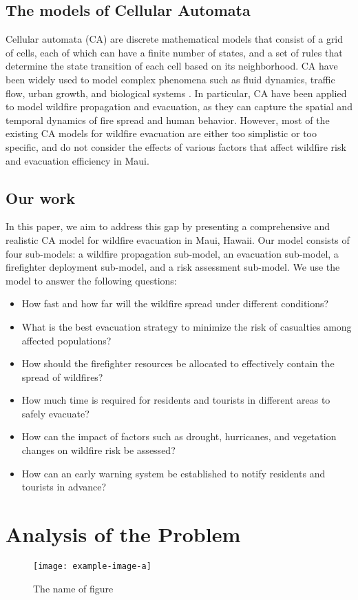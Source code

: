 \documentclass{mcmthesis}
\begin{document}
\subsection{The models of Cellular Automata}
Cellular automata (CA) are discrete mathematical models that consist of a grid of cells, each of which can have a finite number of states, and a set of rules that determine the state transition of each cell based on its neighborhood. CA have been widely used to model complex phenomena such as fluid dynamics, traffic flow, urban growth, and biological systems . In particular, CA have been applied to model wildfire propagation and evacuation, as they can capture the spatial and temporal dynamics of fire spread and human behavior. However, most of the existing CA models for wildfire evacuation are either too simplistic or too specific, and do not consider the effects of various factors that affect wildfire risk and evacuation efficiency in Maui.
\subsection{Our work}
In this paper, we aim to address this gap by presenting a comprehensive and realistic CA model for wildfire evacuation in Maui, Hawaii. Our model consists of four sub-models: a wildfire propagation sub-model, an evacuation sub-model, a firefighter deployment sub-model, and a risk assessment sub-model. We use the model to answer the following questions:
\lipsum[3]
\begin{itemize}
\item How fast and how far will the wildfire spread under different conditions?
\item What is the best evacuation strategy to minimize the risk of casualties among affected populations?
\item How should the firefighter resources be allocated to effectively contain the spread of wildfires?
\item How much time is required for residents and tourists in different areas to safely evacuate?
\item How can the impact of factors such as drought, hurricanes, and vegetation changes on wildfire risk be assessed?
\item How can an early warning system be established to notify residents and tourists in advance?
\end{itemize}

\section{Analysis of the Problem}
\begin{figure}[h]
\small
\centering
\texttt{[image: example-image-a]}
\caption{The name of figure} \label{fig:aa}
\end{figure}
\end{document}
